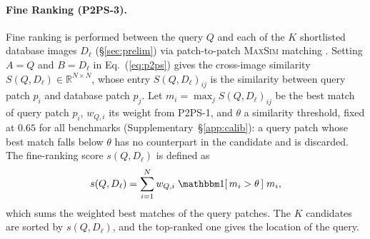 \paragraph{Fine Ranking (P2PS-3).}
\label{sec:core}
Fine ranking is performed between the query $Q$ and each of the $K$ shortlisted database images $D_\ell$ (\S\ref{sec:prelim}) via patch-to-patch \textsc{MaxSim} matching \citep{chamfer}. Setting $A=Q$ and $B=D_\ell$ in Eq.~(\ref{eq:p2ps}) gives the cross-image similarity $S(Q,D_\ell)\in\mathbb R^{N\times N}$, whose entry $S(Q,D_\ell)_{ij}$ is the similarity between query patch $p_i$ and database patch $p_j$. Let $m_i=\max_j S(Q,D_\ell)_{ij}$ be the best match of query patch $p_i$, $w_{Q,i}$ its weight from P2PS-1, and $\theta$ a similarity threshold, fixed at $0.65$ for all benchmarks (Supplementary~\S\ref{app:calib}): a query patch whose best match falls below $\theta$ has no counterpart in the candidate and is discarded. The fine-ranking score $s(Q,D_\ell)$ is defined as
\begin{equation}\label{eq:stage2}
  s(Q,D_\ell)=\sum_{i=1}^{N} w_{Q,i}\;\ind[\,m_i>\theta\,]\;m_i ,
\end{equation}
which sums the weighted best matches of the query patches. The $K$ candidates are sorted by $s(Q,D_\ell)$, and the top-ranked one gives the location of the query.
